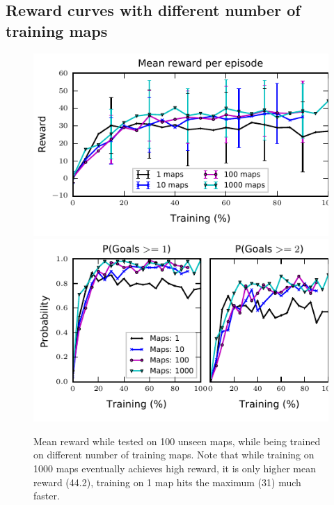 \subsection{Reward curves with different number of training maps}
\begin{figure}[h]%
\includegraphics[width=0.5\columnwidth]{images/plot_reward_3D-1000.pdf}%
\includegraphics[width=0.5\columnwidth]{images/plot_probability_3D-1000.pdf}%
\vspace{-1em}%
\caption{Mean reward while tested on 100 unseen maps, while being trained on different number of training maps. Note that while training on 1000 maps eventually achieves high reward, it is only higher mean reward (44.2), training on 1 map hits the maximum (31) much faster.}%
\label{fig:plot_reward_on_testing}%
\end{figure}


